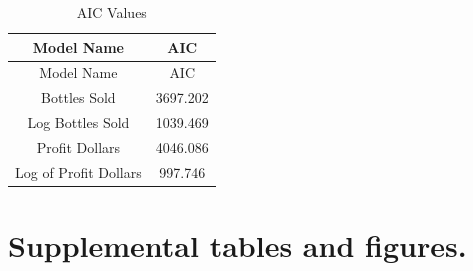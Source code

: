 \documentclass[]{elsarticle} %
\begin{document}
\begin{longtable}[]{@{}cc@{}}
\caption{AIC Values}\tabularnewline
\toprule
\begin{minipage}[b]{0.29\columnwidth}\centering\strut
Model Name\strut
\end{minipage} & \begin{minipage}[b]{0.10\columnwidth}\centering\strut
AIC\strut
\end{minipage}\tabularnewline
\midrule
\endfirsthead
\toprule
\begin{minipage}[b]{0.29\columnwidth}\centering\strut
Model Name\strut
\end{minipage} & \begin{minipage}[b]{0.10\columnwidth}\centering\strut
AIC\strut
\end{minipage}\tabularnewline
\midrule
\endhead
\begin{minipage}[t]{0.29\columnwidth}\centering\strut
Bottles Sold\strut
\end{minipage} & \begin{minipage}[t]{0.10\columnwidth}\centering\strut
3697.202\strut
\end{minipage}\tabularnewline
\begin{minipage}[t]{0.29\columnwidth}\centering\strut
Log Bottles Sold\strut
\end{minipage} & \begin{minipage}[t]{0.10\columnwidth}\centering\strut
1039.469\strut
\end{minipage}\tabularnewline
\begin{minipage}[t]{0.29\columnwidth}\centering\strut
Profit Dollars\strut
\end{minipage} & \begin{minipage}[t]{0.10\columnwidth}\centering\strut
4046.086\strut
\end{minipage}\tabularnewline
\begin{minipage}[t]{0.29\columnwidth}\centering\strut
Log of Profit Dollars\strut
\end{minipage} & \begin{minipage}[t]{0.10\columnwidth}\centering\strut
997.746\strut
\end{minipage}\tabularnewline
\bottomrule
\end{longtable}

\section{Supplemental tables and
figures.}\label{supplemental-tables-and-figures.}
\end{document}
